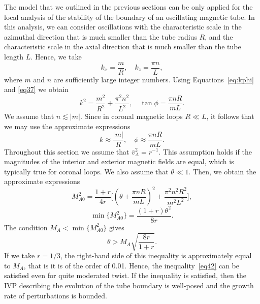 The model that we outlined in the previous sections can be only applied for the local analysis of the stability of the boundary of an oscillating magnetic tube.
In this analysis, we can consider oscillations with the characteristic scale in the azimuthal direction that is much smaller than the tube radius $R$\/, and   the characteristic scale in the axial direction that is much smaller than the tube length $L$\/.
Hence, we take 
%
\begin{equation}
\label{eq37}
k_x = \frac mR, \quad k_z = \frac{\pi n}L,
\end{equation}
%
where $m$ and $n$ are sufficiently large integer numbers. Using Equations~\eqref{eq:kphi} and \eqref{eq37} we obtain 
%
\begin{equation}
\label{eq38}
k^2 = \frac{m^2}{R^2} +  \frac{\pi^2 n^2}{L^2}, \quad 
\tan\phi = \frac{\pi nR}{mL} . 
\end{equation}
%
We assume that $n \lesssim |m|$. Since in coronal magnetic loops $R \ll L$, it follows that we may use the approximate expressions
%
\begin{equation}
\label{eq39}
k \approx \frac{|m|}R , \quad \phi \approx \frac{\pi nR}{mL} . 
\end{equation}
%
Throughout this section we assume that $\bar v_A^2 = r^{-1}$. This assumption holds if the magnitudes of the interior and exterior magnetic fields are equal, which is typically true for coronal loops. We also assume that $\theta \ll 1$.
Then, we obtain the approximate expressions
%
\begin{equation}
\label{eq40}
M_{A 0}^2 = \frac{1 + r}{4r}\bigg[\left(\theta + \frac{\pi nR}{mL}\right)^2 +
\frac{\pi^2 n^2 R^2}{m^2 L^2}\bigg] ,
\end{equation}
%
\begin{equation}
\label{eq41}
\min \{ M_{A0}^2 \} = \frac{(1 + r)\theta^2}{8r} .
\end{equation}
%
The condition $M_A <  \min \{ M_{A0}^2 \}$ gives 
%
\begin{equation}
\label{eq42}
\theta > M_A\sqrt{ \frac{8r}{1 + r}} .
\end{equation}
%
If we take $r = 1/3$, the right-hand side of this inequality is approximately equal to $M_A$, that is it is of the order of 0.01.
Hence, the inequality~\eqref{eq42} can be satisfied even for quite moderated twist.
If the inequality is satisfied, then the IVP describing the evolution of the tube boundary is well-posed and the growth rate of perturbations is bounded.

